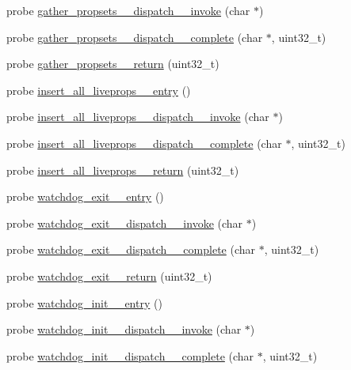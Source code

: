 \begin{DoxyCompactItemize}
\item 
probe \hyperlink{apache__probes_8d_a4c0f6ac0146d26f7a551b711bde92e6a}{gather\+\_\+propsets\+\_\+\+\_\+dispatch\+\_\+\+\_\+invoke} (char $\ast$)
\item 
probe \hyperlink{apache__probes_8d_a1a6226930fb2cbf6cbf8c78b0ef3fb71}{gather\+\_\+propsets\+\_\+\+\_\+dispatch\+\_\+\+\_\+complete} (char $\ast$, uint32\+\_\+t)
\item 
probe \hyperlink{apache__probes_8d_a9f6e063967e88b74b70ef25e65a3e21f}{gather\+\_\+propsets\+\_\+\+\_\+return} (uint32\+\_\+t)
\item 
probe \hyperlink{apache__probes_8d_a8fc61e8150a24f52a102b644afd2202b}{insert\+\_\+all\+\_\+liveprops\+\_\+\+\_\+entry} ()
\item 
probe \hyperlink{apache__probes_8d_afbaa0ead9098a1dc9b81e7022c12eb02}{insert\+\_\+all\+\_\+liveprops\+\_\+\+\_\+dispatch\+\_\+\+\_\+invoke} (char $\ast$)
\item 
probe \hyperlink{apache__probes_8d_a67b0aca0b5d9008ca9183f0c749a96f6}{insert\+\_\+all\+\_\+liveprops\+\_\+\+\_\+dispatch\+\_\+\+\_\+complete} (char $\ast$, uint32\+\_\+t)
\item 
probe \hyperlink{apache__probes_8d_afec482765fe16262a18654eb45a2453b}{insert\+\_\+all\+\_\+liveprops\+\_\+\+\_\+return} (uint32\+\_\+t)
\item 
probe \hyperlink{apache__probes_8d_abd73592a1c6213a6fc5bc36a9246f7b2}{watchdog\+\_\+exit\+\_\+\+\_\+entry} ()
\item 
probe \hyperlink{apache__probes_8d_a7f20c840f6bcbf833cccb890f53dbd92}{watchdog\+\_\+exit\+\_\+\+\_\+dispatch\+\_\+\+\_\+invoke} (char $\ast$)
\item 
probe \hyperlink{apache__probes_8d_a0ff92950f560681234b7db600f487c12}{watchdog\+\_\+exit\+\_\+\+\_\+dispatch\+\_\+\+\_\+complete} (char $\ast$, uint32\+\_\+t)
\item 
probe \hyperlink{apache__probes_8d_abbef27f6c9c44f985f248dd01a8f46fa}{watchdog\+\_\+exit\+\_\+\+\_\+return} (uint32\+\_\+t)
\item 
probe \hyperlink{apache__probes_8d_a7f0146f80d8637a10efb2f728ec5112d}{watchdog\+\_\+init\+\_\+\+\_\+entry} ()
\item 
probe \hyperlink{apache__probes_8d_a1bbfcd26f03e52bcd4a8590b26389bf1}{watchdog\+\_\+init\+\_\+\+\_\+dispatch\+\_\+\+\_\+invoke} (char $\ast$)
\item 
probe \hyperlink{apache__probes_8d_a2dd91bc817b9341c16307612b96d1db1}{watchdog\+\_\+init\+\_\+\+\_\+dispatch\+\_\+\+\_\+complete} (char $\ast$, uint32\+\_\+t)

\end{DoxyCompactItemize}
